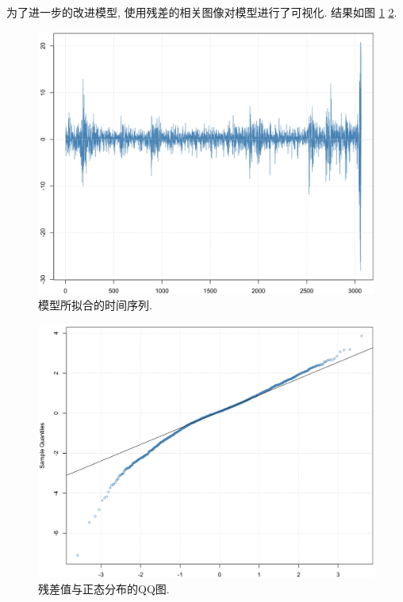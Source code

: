 \documentclass[11pt]{article}
\begin{document}
\qquad 为了进一步的改进模型, 使用残差的相关图像对模型进行了可视化. 结果如图 \ref{fig:13} \ref{fig:14}.
\begin{center}
    \hspace{30pt}\begin{minipage}{0.45\textwidth}
        \begin{figure}
            \centering
            \hspace{-25pt}\includegraphics[width=.9\textwidth]{output_36_0}
            \caption{模型所拟合的时间序列.\label{fig:13}}
        \end{figure}
    \end{minipage}
    \begin{minipage}{0.45\textwidth}
        \begin{figure}
            \centering
            \hspace{-25pt}\includegraphics[width=.9\textwidth]{output_37_0}
            \caption{残差值与正态分布的QQ图.\label{fig:14}}
        \end{figure}
    \end{minipage}
\end{center}
    
\end{document}

